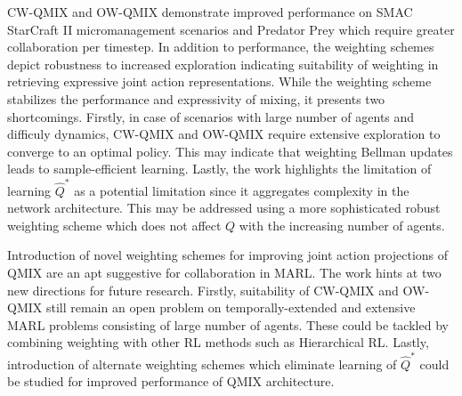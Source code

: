 \documentclass[11pt,letterpaper]{article}
\begin{document}
CW-QMIX and OW-QMIX demonstrate improved performance on SMAC StarCraft II micromanagement scenarios and Predator Prey which require greater collaboration per timestep. In addition to performance, the weighting schemes depict robustness to increased exploration indicating suitability of weighting in retrieving expressive joint action representations. While the weighting scheme stabilizes the performance and expressivity of mixing, it presents two shortcomings. Firstly, in case of scenarios with large number of agents and difficuly dynamics, CW-QMIX and OW-QMIX require extensive exploration to converge to an optimal policy. This may indicate that weighting Bellman updates leads to sample-efficient learning. Lastly, the work highlights the limitation of learning $\hat{Q}^{*}$ as a potential limitation since it aggregates complexity in the network architecture. This may be addressed using a more sophisticated robust weighting scheme which does not affect $Q$ with the increasing number of agents. 

Introduction of novel weighting schemes for improving joint action projections of QMIX are an apt suggestive for collaboration in MARL. The work hints at two new directions for future research. Firstly, suitability of CW-QMIX and OW-QMIX still remain an open problem on temporally-extended and extensive MARL problems consisting of large number of agents. These could be tackled by combining weighting with other RL methods such as Hierarchical RL. Lastly, introduction of alternate weighting schemes which eliminate learning of $\hat{Q}^{*}$ could be studied for improved performance of QMIX architecture. 
\end{document}
